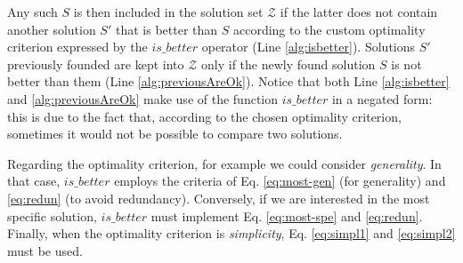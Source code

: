 \documentclass[a4wide,11pt]{article}
\theoremstyle{definition}
\theoremstyle{plain}
\begin{document}
Any such $S$ is then included in the solution set $\mathcal{Z}$ if the latter does not contain another solution $S'$ that is better than $S$ according to the custom optimality criterion expressed by the ${is\_better}$ operator (Line \ref{alg:isbetter}). Solutions $S'$ previously founded are kept into $\mathcal{Z}$ only if the newly found solution $S$ is not better than them (Line \ref{alg:previousAreOk}). Notice that both Line \ref{alg:isbetter} and \ref{alg:previousAreOk} make use of the function $is\_better$ in a negated form: this is due to the fact that, according to the chosen optimality criterion, sometimes it would not be possible to compare two solutions.

Regarding the optimality criterion, for example we could consider \emph{generality}. In that case, ${is\_better}$ employs the criteria of Eq. \eqref{eq:most-gen} (for generality) and \eqref{eq:redun} (to avoid redundancy). Conversely, if we are interested in the most specific solution, ${is\_better}$ must implement Eq. \eqref{eq:most-spe} and \eqref{eq:redun}.
Finally, when the optimality criterion is \emph{simplicity}, Eq. \eqref{eq:simpl1} and \eqref{eq:simpl2} must be used.
\end{document}
